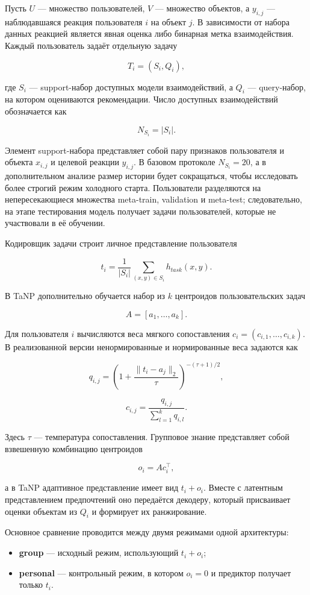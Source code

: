 \documentclass[12pt,a4paper]{article}
\begin{document}
Пусть $U$ --- множество пользователей, $V$ --- множество объектов, а
$y_{i,j}$ --- наблюдавшаяся реакция пользователя $i$ на объект $j$. В
зависимости от набора данных реакцией является явная оценка либо бинарная
метка взаимодействия. Каждый пользователь задаёт отдельную задачу

\[
T_i=(S_i,Q_i),
\]

где $S_i$ --- support-набор доступных модели взаимодействий, а $Q_i$ ---
query-набор, на котором оцениваются рекомендации. Число доступных
взаимодействий обозначается как

\[
N_{S_i}=|S_i|.
\]

Элемент support-набора представляет собой пару признаков пользователя и
объекта $x_{i,j}$ и целевой реакции $y_{i,j}$. В базовом протоколе
$N_{S_i}=20$, а в дополнительном анализе размер истории будет сокращаться,
чтобы исследовать более строгий режим холодного старта. Пользователи
разделяются на непересекающиеся множества meta-train, validation и meta-test;
следовательно, на этапе тестирования модель получает задачи пользователей,
которые не участвовали в её обучении.

Кодировщик задачи строит личное представление пользователя

\[
t_i=\frac{1}{|S_i|}\sum_{(x,y)\in S_i}h_{task}(x,y).
\]

В TaNP дополнительно обучается набор из $k$ центроидов пользовательских задач

\[
A=[a_1,\ldots,a_k].
\]

Для пользователя $i$ вычисляются веса мягкого сопоставления
$c_i=(c_{i,1},\ldots,c_{i,k})$. В реализованной версии ненормированные и
нормированные веса задаются как

\[
q_{i,j}=\left(1+\frac{\lVert t_i-a_j\rVert_2}{\tau}\right)^{-(\tau+1)/2},
\]

\[
c_{i,j}=\frac{q_{i,j}}{\sum_{l=1}^{k}q_{i,l}}.
\]

Здесь $\tau$ --- температура сопоставления. Групповое знание представляет
собой взвешенную комбинацию центроидов

\[
o_i=A c_i^{\top},
\]

а в TaNP адаптивное представление имеет вид $t_i+o_i$. Вместе с латентным
представлением предпочтений оно передаётся декодеру, который присваивает
оценки объектам из $Q_i$ и формирует их ранжирование.

Основное сравнение проводится между двумя режимами одной архитектуры:

\begin{itemize}
    \item \textbf{group} --- исходный режим, использующий $t_i+o_i$;
    \item \textbf{personal} --- контрольный режим, в котором $o_i=0$ и
    предиктор получает только $t_i$.
\end{itemize}
\end{document}

